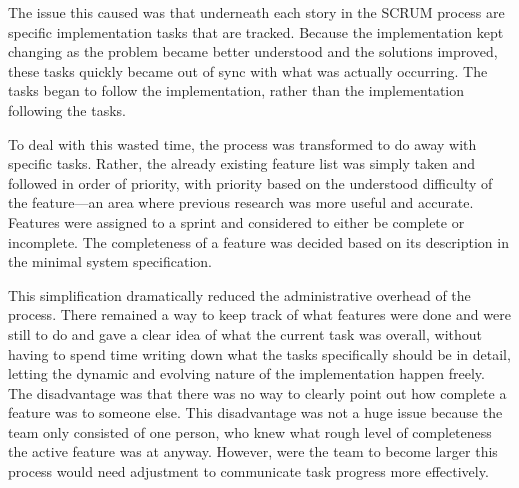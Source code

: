The issue this caused was that underneath each story in the SCRUM process are specific implementation tasks that are tracked. Because the implementation kept changing as the problem became better understood and the solutions improved, these tasks quickly became out of sync with what was actually occurring. The tasks began to follow the implementation, rather than the implementation following the tasks.

To deal with this wasted time, the process was transformed to do away with specific tasks. Rather, the already existing feature list was simply taken and followed in order of priority, with priority based on the understood difficulty of the feature---an area where previous research was more useful and accurate. Features were assigned to a sprint and considered to either be complete or incomplete. The completeness of a feature was decided based on its description in the minimal system specification.

This simplification dramatically reduced the administrative overhead of the process. There remained a way to keep track of what features were done and were still to do and gave a clear idea of what the current task was overall, without having to spend time writing down what the tasks specifically should be in detail, letting the dynamic and evolving nature of the implementation happen freely. The disadvantage was that there was no way to clearly point out how complete a feature was to someone else. This disadvantage was not a huge issue because the team only consisted of one person, who knew what rough level of completeness the active feature was at anyway. However, were the team to become larger this process would need adjustment to communicate task progress more effectively.

